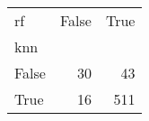 \begin{tabular}{lrr}
\toprule
rf &  False &  True  \\
knn   &        &        \\
\midrule
False &     30 &     43 \\
True  &     16 &    511 \\
\bottomrule
\end{tabular}
